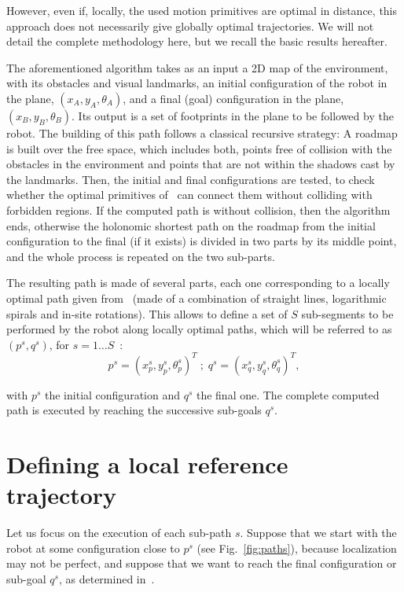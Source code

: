 However, even if, locally, the used motion primitives are optimal in distance, this approach does not necessarily give globally optimal trajectories. We will not detail the complete methodology here, but we recall the basic results hereafter.

The aforementioned algorithm takes as an input a 2D map of the environment, with its obstacles and visual landmarks, an initial configuration of the robot in the plane, $(x_A,y_A,\theta_A)$, and a final (goal) configuration in the plane, $(x_B,y_B,\theta_B)$. Its output is a set of footprints in the plane to be followed by the robot. The building of this path follows a classical recursive strategy: A roadmap is built over the free space, which includes both, points free of collision with the obstacles in the environment and points that are not within the shadows cast by the landmarks. Then, the initial and final configurations are tested, to check whether the optimal primitives of~\citep{Salaris:2010} can connect them without colliding with forbidden regions. If the computed path is without collision, then the algorithm ends, otherwise the holonomic shortest path on the roadmap from the initial configuration to the final (if it exists) is divided in two parts by its middle point, and the whole process is repeated on the two sub-parts. 

The resulting path is made of several parts, each one corresponding to a locally optimal path given from~\citep{Salaris:2010} (made of a combination of straight lines, logarithmic spirals and in-site rotations). This allows to define a set of $S$ sub-segments to be performed by the robot along locally optimal paths, which will be referred to as $(p^s,q^s)$, for $s=1\dots S$~:
$$
p^s = (x_p^s,y_p^s,\theta_p^s)^T \; ; \; q^s = (x_q^s,y_q^s,\theta_q^s)^T,
$$

with $p^s$ the initial configuration and $q^s$ the final one. The complete computed path is executed by reaching the successive sub-goals $q^s$.


\section{Defining a local reference trajectory}

\label{sec:reftrajectories}

Let us focus on the execution of each sub-path $s$. Suppose that we start with the robot at some configuration close to $p^s$ (see Fig.~\ref{fig:paths}), because localization may not be perfect, and suppose that we want to reach the final configuration or sub-goal $q^s$, as determined in~\citep{jib-IJHR2010}.

